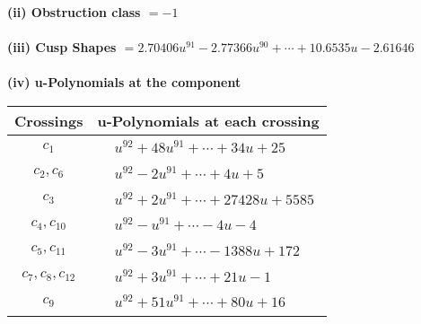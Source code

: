 \documentclass[1p]{elsarticle_modified}
\theoremstyle{definition}
\begin{document}
\flushleft \textbf{(ii) Obstruction class $= -1$}\\~\\
\flushleft \textbf{(iii) Cusp Shapes $= 2.70406 u^{91}-2.77366 u^{90}+\cdots+10.6535 u-2.61646$}\\~\\
\newpage\renewcommand{\arraystretch}{1}
\flushleft \textbf{(iv) u-Polynomials at the component}\newline \\
\begin{tabular}{m{50pt}|m{274pt}}
Crossings & \hspace{64pt}u-Polynomials at each crossing \\
\hline $$\begin{aligned}c_{1}\end{aligned}$$&$\begin{aligned}
&u^{92}+48 u^{91}+\cdots+34 u+25
\end{aligned}$\\
\hline $$\begin{aligned}c_{2},c_{6}\end{aligned}$$&$\begin{aligned}
&u^{92}-2 u^{91}+\cdots+4 u+5
\end{aligned}$\\
\hline $$\begin{aligned}c_{3}\end{aligned}$$&$\begin{aligned}
&u^{92}+2 u^{91}+\cdots+27428 u+5585
\end{aligned}$\\
\hline $$\begin{aligned}c_{4},c_{10}\end{aligned}$$&$\begin{aligned}
&u^{92}- u^{91}+\cdots-4 u-4
\end{aligned}$\\
\hline $$\begin{aligned}c_{5},c_{11}\end{aligned}$$&$\begin{aligned}
&u^{92}-3 u^{91}+\cdots-1388 u+172
\end{aligned}$\\
\hline $$\begin{aligned}c_{7},c_{8},c_{12}\end{aligned}$$&$\begin{aligned}
&u^{92}+3 u^{91}+\cdots+21 u-1
\end{aligned}$\\
\hline $$\begin{aligned}c_{9}\end{aligned}$$&$\begin{aligned}
&u^{92}+51 u^{91}+\cdots+80 u+16
\end{aligned}$\\
\hline
\end{tabular}\\~\\
\end{document}

